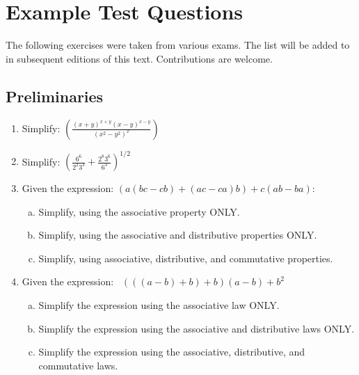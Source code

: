 \chapter{Example Test Questions}\label{Practice}

The following exercises were taken from various exams. The list will be added to in subsequent editions of this text.  Contributions are welcome.


\section{Preliminaries}
\begin{enumerate}[(1)]
\item
Simplify:
$\displaystyle{ \left(\frac{(x+y)^{x+y}(x-y)^{x-y}}{(x^2 - y^2)^x}\right)}$
\item
Simplify:
$ \displaystyle{\left( \frac{6^6}{2^2 3^3} +  \frac{2^8 3^6}{6^3}\right)^{1/2}} $
\item
Given the expression:  $( a(bc - cb) + (ac - ca)b) + c(ab - ba)$:
\begin{enumerate}[(a)]
\item
Simplify, using the associative property ONLY.
\item
Simplify, using the associative and distributive properties ONLY.
\item
Simplify, using associative, distributive, and commutative properties.
\end{enumerate}

\item
Given the expression:~
 $(((a-b)+b)+b)(a-b) + b^2$
\begin{enumerate}[(a)]
\item
Simplify the expression using the associative law ONLY.
\item
Simplify the expression using the associative and distributive laws ONLY.
\item
Simplify the expression using the associative, distributive, and commutative laws.
\end{enumerate}



\end{enumerate}

